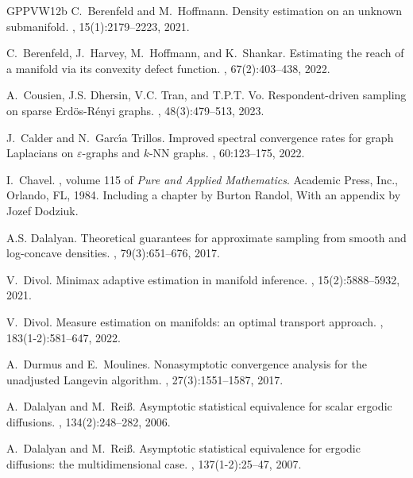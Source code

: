 \documentclass[10pt,a4paper]{article}
\begin{document}
{\begin{thebibliography}{GPPVW12b}
C.~Berenfeld and M.~Hoffmann.
\newblock Density estimation on an unknown submanifold.
, 15(1):2179--2223, 2021.

C.~Berenfeld, J.~Harvey, M.~Hoffmann, and K.~Shankar.
\newblock Estimating the reach of a manifold via its convexity defect function.
, 67(2):403--438, 2022.

A.~Cousien, J.S. Dhersin, V.C. Tran, and T.P.T. Vo.
\newblock Respondent-driven sampling on sparse {E}rd\"os-{R}\'enyi graphs.
, 48(3):479--513, 2023.

J.~{Calder} and N.~{Garc\'{\i}a Trillos}.
\newblock Improved spectral convergence rates for graph {L}aplacians on
  {$\varepsilon$}-graphs and {$k$}-{NN} graphs.
, 60:123--175, 2022.

I.~{Chavel}.
, volume 115 of {\em Pure
  and Applied Mathematics}.
\newblock Academic Press, Inc., Orlando, FL, 1984.
\newblock Including a chapter by Burton Randol, With an appendix by Jozef
  Dodziuk.

A.S. Dalalyan.
\newblock Theoretical guarantees for approximate sampling from smooth and
  log-concave densities.
, 79(3):651--676, 2017.

V.~Divol.
\newblock Minimax adaptive estimation in manifold inference.
, 15(2):5888--5932, 2021.

V.~{Divol}.
\newblock Measure estimation on manifolds: an optimal transport approach.
, 183(1-2):581--647, 2022.

A.~Durmus and E.~Moulines.
\newblock Nonasymptotic convergence analysis for the unadjusted {L}angevin
  algorithm.
, 27(3):1551--1587, 2017.

A.~Dalalyan and M.~Rei\ss.
\newblock Asymptotic statistical equivalence for scalar ergodic diffusions.
, 134(2):248--282, 2006.

A.~Dalalyan and M.~Rei\ss.
\newblock Asymptotic statistical equivalence for ergodic diffusions: the
  multidimensional case.
, 137(1-2):25--47, 2007.


\end{thebibliography}}
\end{document}
